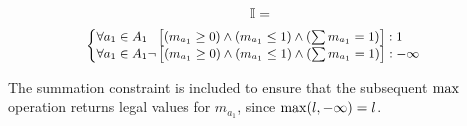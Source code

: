 \vspace{-2.5mm}
{\small 
\abovedisplayskip=0pt
\belowdisplayskip=0pt
\begin{multline*}
  \mathbb{I} = \\
  {\footnotesize
    \begin{cases}
      \forall a_{1} \in A_1 \hspace{6pt}\left[(m_{a_{1}} \geq 0) \wedge (m_{a_{1}} \leq 1 ) \wedge (\sum m_{a_{1}} = 1) \right]: 1 \\ 
      \forall a_{1} \in A_1 \neg \left[(m_{a_{1}} \geq 0) \wedge (m_{a_{1}} \leq 1 ) \wedge (\sum m_{a_{1}} = 1) \right]: -\infty \\ 
    \end{cases} \nonumber
   }
\end{multline*}
}%

The summation constraint is included to ensure that the subsequent
$\mathrm{max}$ operation returns legal values for $m_{a_1}$, since
$\mathrm{max}(l, -\infty) = l$.

